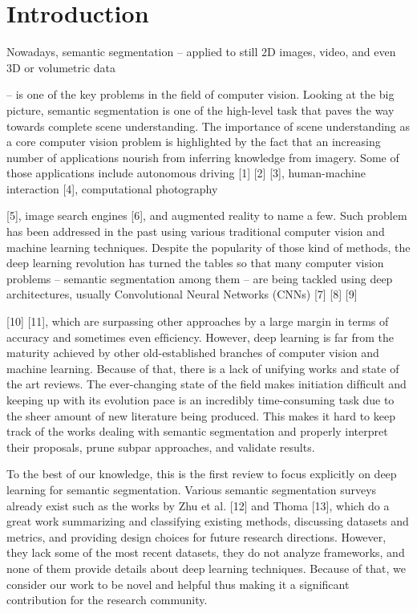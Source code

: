 \section{Introduction}
Nowadays, semantic segmentation – applied to still 2D images, video, and even 3D or volumetric data

– is one of the key problems in the ﬁeld of computer vision. Looking at the big picture, semantic segmentation is one of the high-level task that paves the way towards complete scene understanding. The importance of scene understanding as a core computer vision problem is highlighted by the fact that an increasing number of applications nourish from inferring knowledge from imagery. Some of those applications include autonomous driving [1] [2] [3], human-machine interaction [4], computational photography

[5], image search engines [6], and augmented reality to name a few. Such problem has been addressed in the past using various traditional computer vision and machine learning techniques. Despite the popularity of those kind of methods, the deep learning revolution has turned the tables so that many computer vision problems – semantic segmentation among them – are being tackled using deep architectures, usually Convolutional Neural Networks (CNNs) [7] [8] [9]

[10] [11], which are surpassing other approaches by a large margin in terms of accuracy and sometimes even efﬁciency. However, deep learning is far from the maturity achieved by other old-established branches of computer vision and machine learning. Because of that, there is a lack of unifying works and state of the art reviews. The ever-changing state of the ﬁeld makes initiation difﬁcult and keeping up with its evolution pace is an incredibly time-consuming task due to the sheer amount of new literature being produced. This makes it hard to keep track of the works dealing with semantic segmentation and properly interpret their proposals, prune subpar approaches, and validate results.

To the best of our knowledge, this is the ﬁrst review to focus explicitly on deep learning for semantic segmentation. Various semantic segmentation surveys already exist such as the works by Zhu et al. [12] and Thoma [13], which do a great work summarizing and classifying existing methods, discussing datasets and metrics, and providing design choices for future research directions. However, they lack some of the most recent datasets, they do not analyze frameworks, and none of them provide details about deep learning techniques. Because of that, we consider our work to be novel and helpful thus making it a signiﬁcant contribution for the research community.

